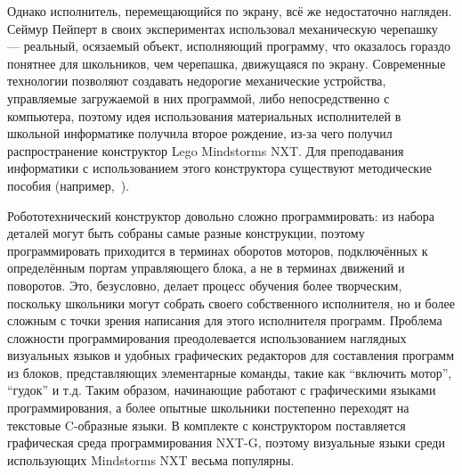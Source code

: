 \documentclass[a4paper]{article}
\begin{document}
Однако исполнитель, перемещающийся по экрану, всё же недостаточно нагляден. Сеймур Пейперт в своих экспериментах использовал механическую черепашку~\cite{logoTurtle} --- реальный, осязаемый объект, исполняющий программу, что оказалось гораздо понятнее для школьников, чем черепашка, движущаяся по экрану. Современные технологии позволяют создавать недорогие механические устройства, управляемые загружаемой в них программой, либо непосредственно с компьютера, поэтому идея использования материальных исполнителей в школьной информатике получила второе рождение, из-за чего получил распространение конструктор Lego Mindstorms NXT. Для преподавания информатики с использованием этого конструктора существуют методические пособия (например,~\cite{filippov}). 

Робототехнический конструктор довольно сложно программировать: из набора деталей могут быть собраны самые разные конструкции, поэтому программировать приходится в терминах оборотов моторов, подключённых к определённым портам управляющего блока, а не в терминах движений и поворотов. Это, безусловно, делает процесс обучения более творческим, поскольку школьники могут собрать своего собственного исполнителя, но и более сложным с точки зрения написания для этого исполнителя программ. Проблема сложности программирования преодолевается использованием наглядных визуальных языков и удобных графических редакторов для составления программ из блоков, представляющих элементарные команды, такие как ``включить мотор'', ``гудок'' и т.д. Таким образом, начинающие работают с графическими языками программирования, а более опытные школьники постепенно переходят на текстовые C-образные языки. В комплекте с конструктором поставляется графическая среда программирования NXT-G, поэтому визуальные языки среди использующих Mindstorms NXT весьма популярны.
\end{document}
